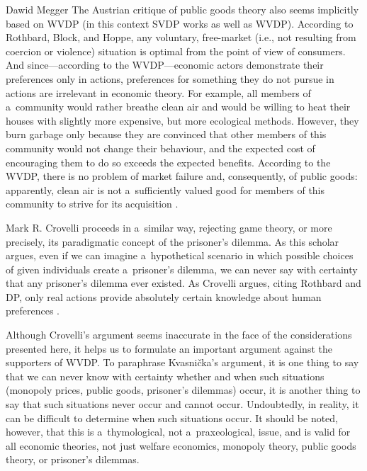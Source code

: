 \begin{artengenv}{Dawid Megger}
The Austrian critique of public goods theory also seems implicitly based on WVDP (in this context SVDP works as well as WVDP). According to Rothbard, Block, and Hoppe, any voluntary, free-market (i.e., not resulting from coercion or violence) situation is optimal from the point of view of consumers. And since---according to the WVDP---economic actors demonstrate their preferences only in actions, preferences for something they do not pursue in actions are irrelevant in economic theory. For example, all members of a~community would rather breathe clean air and would be willing to heat their houses with slightly more expensive, but more ecological methods. However, they burn garbage only because they are convinced that other members of this community would not change their behaviour, and the expected cost of encouraging them to do so exceeds the expected benefits. According to the WVDP, there is no problem of market failure and, consequently, of public goods: apparently, clean air is not a~sufficiently valued good for members of this community to strive for its acquisition 
\parencites[][]{block_public_1983}[][]{hoppe_theory_1989}[][]{hoppe_economics_2006}[][]{wisniewski_economics_2018}.%




Mark R. Crovelli proceeds in a~similar way, rejecting game theory, or more precisely, its paradigmatic concept of the prisoner's dilemma. As this scholar argues, even if we can imagine a~hypothetical scenario in which possible choices of given individuals create a~prisoner's dilemma, we can never say with certainty that any prisoner's dilemma ever existed. As Crovelli argues, citing Rothbard and DP, only real actions provide absolutely certain knowledge about human preferences 
\parencite[][]{crovelli_trouble_2006}.%




Although Crovelli's argument seems inaccurate in the face of the considerations presented here, it helps us to formulate an important argument against the supporters of WVDP. To paraphrase Kvasnička's argument, it is one thing to say that we can never know with certainty whether and when such situations (monopoly prices, public goods, prisoner's dilemmas) occur, it is another thing to say that such situations never occur and cannot occur. Undoubtedly, in reality, it can be difficult to determine when such situations occur. It should be noted, however, that this is a~thymological, not a~praxeological, issue, and is valid for all economic theories, not just welfare economics, monopoly theory, public goods theory, or prisoner's dilemmas.




\end{artengenv}
